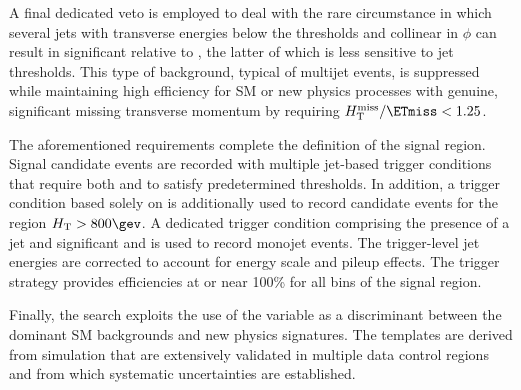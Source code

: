 A final dedicated veto is employed to deal with the rare circumstance
in which several jets with transverse energies below the \Et
thresholds and collinear in $\phi$ can result in significant \mht
relative to \ETmiss, the latter of which is less sensitive to jet
thresholds. This type of background, typical of multijet events, is
suppressed while maintaining high efficiency for SM or new physics
processes with genuine, significant missing transverse momentum by
requiring $\mht / \ETmiss < 1.25$. 

The aforementioned requirements complete the definition of the signal
region. Signal candidate events are recorded with multiple jet-based
trigger conditions that require both \scalht and \alphat to satisfy
predetermined thresholds. In addition, a trigger condition based
solely on \scalht is additionally used to record candidate events for
the region $\scalht > 800\gev$. A dedicated trigger condition
comprising the presence of a jet and significant \mht and \ETmiss is
used to record monojet events. The trigger-level jet energies are
corrected to account for energy scale and pileup effects. The trigger
strategy provides efficiencies at or near 100\% for all bins of the
signal region.

Finally, the search exploits the use of the \mht variable as a
discriminant between the dominant SM backgrounds and new physics
signatures. The \mht templates are derived from simulation that are
extensively validated in multiple data control regions and from which
systematic uncertainties are established.
